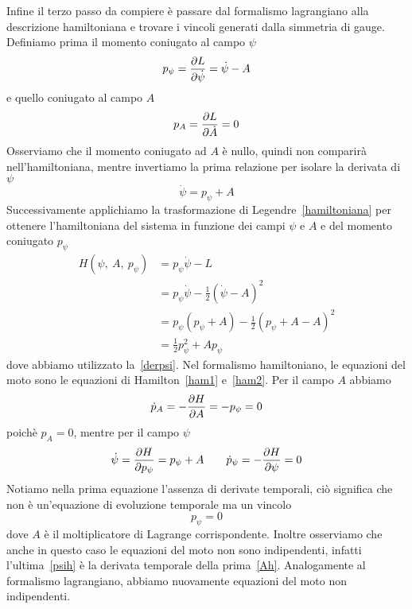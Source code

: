     Infine il terzo passo da compiere è passare dal formalismo lagrangiano alla descrizione hamiltoniana e trovare i vincoli generati dalla simmetria di gauge. Definiamo prima il momento coniugato al campo $\psi$
    \begin{equation*}
        p_\psi = \frac{\partial L}{\partial\dot \psi} = \dot \psi - A
    \end{equation*}
    e quello coniugato al campo $A$
    \begin{equation*}
        p_A = \frac{\partial L}{\partial\dot A} = 0
    \end{equation*}
    Osserviamo che il momento coniugato ad $A$ è nullo, quindi non comparirà nell'hamiltoniana, mentre invertiamo la prima relazione per isolare la derivata di $\psi$
    \begin{equation} \label{derpsi}
        \dot \psi = p_\psi + A
    \end{equation}
    Successivamente applichiamo la trasformazione di Legendre~\eqref{hamiltoniana} per ottenere l'hamiltoniana del sistema in funzione dei campi $\psi$ e $A$ e del momento coniugato $p_\psi$ 
    \begin{equation*}
    \begin{aligned}
        H(\psi,~A,~p_\psi) & = p_\psi \dot \psi - L \\ & = p_\psi \dot \psi - \frac{1}{2} {(\dot \psi - A)}^2 \\ & = p_\psi (p_\psi + A) - \frac{1}{2} {(p_\psi + A - A)}^2 \\ &  = \frac{1}{2} p^2_\psi  + A p_\psi
    \end{aligned}
    \end{equation*}
    dove abbiamo utilizzato la~\eqref{derpsi}. Nel formalismo hamiltoniano, le equazioni del moto sono le equazioni di Hamilton~\eqref{ham1} e~\eqref{ham2}. Per il campo $A$ abbiamo
    \begin{equation} \label{Ah}
        \dot p_A = - \frac{\partial H}{\partial A} = - p_\psi = 0
    \end{equation}
    poichè $p_A = 0$, mentre per il campo $\psi$
    \begin{equation} \label{psih}
        \dot \psi = \frac{\partial H}{\partial p_\psi} = p_\psi + A \qquad \dot p_\psi = - \frac{\partial H}{\partial\psi} = 0
    \end{equation}
    Notiamo nella prima equazione l'assenza di derivate temporali, ciò significa che non è un'equazione di evoluzione temporale ma un vincolo
    \begin{equation*}
        p_\psi = 0
    \end{equation*}
    dove $A$ è il moltiplicatore di Lagrange corrispondente. Inoltre osserviamo che anche in questo caso le equazioni del moto non sono indipendenti, infatti l'ultima~\eqref{psih} è la derivata temporale della prima~\eqref{Ah}. Analogamente al formalismo lagrangiano, abbiamo nuovamente equazioni del moto non indipendenti.

